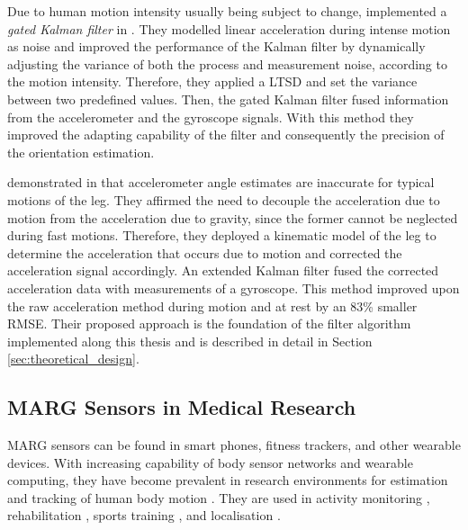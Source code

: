 Due to human motion intensity usually being subject to change, \citeauthor{olivares_vicente_signal_2013} implemented a \emph{gated Kalman filter} in \cite{olivares_vicente_signal_2013}. They modelled linear acceleration during intense motion as noise and improved the performance of the Kalman filter by dynamically adjusting the variance of both the process and measurement noise, according to the motion intensity. Therefore, they applied a \gls{LTSD} and set the variance between two predefined values. Then, the gated Kalman filter fused information from the accelerometer and the gyroscope signals. With this method they improved the adapting capability of the filter and consequently the precision of the orientation estimation.

\citeauthor{bennett_motion_2014} demonstrated in \cite{bennett_motion_2014} that accelerometer angle estimates are inaccurate for typical motions of the leg. They affirmed the need to decouple the acceleration due to motion from the acceleration due to gravity, since the former cannot be neglected during fast motions. Therefore, they deployed a kinematic model of the leg to determine the acceleration that occurs due to motion and corrected the acceleration signal accordingly. An extended Kalman filter fused the corrected acceleration data with measurements of a gyroscope. This method improved upon the raw acceleration method during motion and at rest by an 83\% smaller \gls{RMSE}. Their proposed approach is the foundation of the filter algorithm implemented along this thesis and is described in detail in Section \ref{sec:theoretical_design}.

\subsection{MARG Sensors in Medical Research}\label{sec:MARG_sensors_medical}

MARG sensors can be found in smart phones, fitness trackers, and other wearable devices. With increasing capability of body sensor networks and wearable computing, they have become prevalent in research environments for estimation and tracking of human body motion \cite{bennett_motion_2014}. They are used in activity monitoring \cite{veltink_detection_96}\cite{najafi_ambulatory_03}\cite{ermes_sports_08}, rehabilitation \cite{giggins_rehabilitation_13}\cite{lupinski_ligament_11}, sports training \cite{bonnet_squat_13}\cite{ermes_sports_08}, and localisation \cite{hoflinger_localization_13}\cite{Bennett_distance_13}. 

